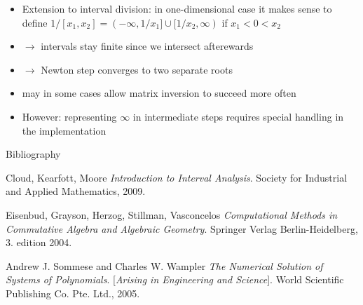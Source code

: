 \documentclass[german,10pt,xcolor=colortbl,compress, handout]{beamer}
\begin{document}
\begin{frame}
    \begin{itemize}
        \item Extension to interval division: in one-dimensional case it makes sense to
            define $1/[x_1, x_2] = (-\infty, 1/x_1] \cup [1/x_2, \infty)$ if $x_1 < 0 <
            x_2$
        \item[]$\rightarrow$ intervals stay finite since we intersect afterewards
        \item[]$\rightarrow$ Newton step converges to two separate roots
        \item may in some cases allow matrix inversion to succeed more often
        \item However: representing $\infty$ in intermediate steps requires special
            handling in the implementation
    \end{itemize}
\end{frame}


\begin{frame}{Bibliography}
    
    \begin{thebibliography}{9}
         Cloud, Kearfott, Moore
            \textit{Introduction to Interval Analysis}.
            Society for Industrial and Applied Mathematics, 2009.


         Eisenbud, Grayson, Herzog, Stillman, Vasconcelos
            \textit{Computational Methods in Commutative Algebra and Algebraic Geometry}.
            Springer Verlag Berlin-Heidelberg, 3. edition 2004.

         Andrew J. Sommese and Charles W. Wampler
            \textit{The Numerical Solution of Systems of Polynomials}. [\textit{Arising in
            Engineering and Science}].
            World Scientific Publishing Co. Pte. Ltd., 2005.

    \end{thebibliography}
\end{frame}
\end{document}
